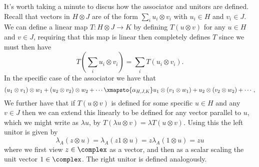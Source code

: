 \documentclass[fleqn]{NotesClass}
\begin{document}
    It's worth taking a minute to discus how the associator and unitors are defined.
    Recall that vectors in \(H \otimes J\) are of the form \(\sum_i u_i \otimes v_i\) with \(u_i \in H\) and \(v_i \in J\).
    We can define a linear map \(T \colon H \otimes J \to K\) by defining \(T(u \otimes v)\) for any \(u \in H\) and \(v \in J\), requiring that this map is linear then completely defines \(T\) since we must then have
    \begin{equation}
        T\left( \sum_i u_i \otimes v_i \right) = \sum_i T(u_i \otimes v_i).
    \end{equation}
    In the specific case of the associator we have that
    \begin{equation}
        (u_1 \otimes v_1) \otimes w_1 + (u_2 \otimes v_2) \otimes w_2 + \dotsb \xmapsto{\alpha_{H,J,K}} u_1 \otimes (v_1 \otimes w_1) + u_2 \otimes (v_2 \otimes w_2) + \dotsb,
    \end{equation}
    We further have that if \(T(u \otimes v)\) is defined for some specific \(u \in H\) and any \(v \in J\) then we can extend this linearly to be defined for any vector parallel to \(u\), which we might write as \(\lambda u\), by \(T(\lambda u \otimes v) = \lambda T(u \otimes v)\).
    Using this the left unitor is given by
    \begin{equation}
        \lambda_A(z \otimes u) = \lambda_A(z1 \otimes u) = z\lambda_A(1 \otimes u) = zu
    \end{equation}
    where we first view \(z \in \complex\) as a vector, and then as a scalar scaling the unit vector \(1 \in \complex\).
    The right unitor is defined analogously.
    
\end{document}
